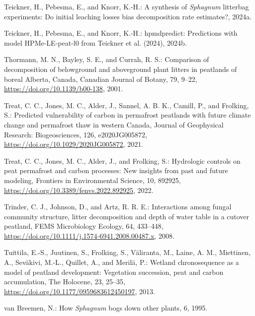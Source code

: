 \documentclass[
  12pt,
]{article}
\newlength{\cslhangindent}
\newlength{\cslentryspacingunit} %
\newenvironment{CSLReferences}[2] %
 {%
  \setlength{\parindent}{0pt}
  \ifodd #1
  \let\oldpar\par
  \def\par{\hangindent=\cslhangindent\oldpar}
  \fi
  \setlength{\parskip}{#2\cslentryspacingunit}
 }%
 {}
\begin{document}
\begin{CSLReferences}{0}{0}
\leavevmode{}%
Teickner, H., Pebesma, E., and Knorr, K.-H.: A synthesis of {\emph{Sphagnum}} litterbag experiments: {Do} initial leaching losses bias decomposition rate estimates?, 2024a.

\leavevmode{}%
Teickner, H., Pebesma, E., and Knorr, K.-H.: {hpmdpredict}: {Predictions} with model {HPMe-LE-peat-l0} from {Teickner} et al. (2024), 2024b.

\leavevmode{}%
Thormann, M. N., Bayley, S. E., and Currah, R. S.: Comparison of decomposition of belowground and aboveground plant litters in peatlands of boreal {Alberta}, {Canada}, Canadian Journal of Botany, 79, 9--22, \url{https://doi.org/10.1139/b00-138}, 2001.

\leavevmode{}%
Treat, C. C., Jones, M. C., Alder, J., Sannel, A. B. K., Camill, P., and Frolking, S.: Predicted vulnerability of carbon in permafrost peatlands with future climate change and permafrost thaw in western {Canada}, Journal of Geophysical Research: Biogeosciences, 126, e2020JG005872, \url{https://doi.org/10.1029/2020JG005872}, 2021.

\leavevmode{}%
Treat, C. C., Jones, M. C., Alder, J., and Frolking, S.: Hydrologic controls on peat permafrost and carbon processes: {New} insights from past and future modeling, Frontiers in Environmental Science, 10, 892925, \url{https://doi.org/10.3389/fenvs.2022.892925}, 2022.

\leavevmode{}%
Trinder, C. J., Johnson, D., and Artz, R. R. E.: Interactions among fungal community structure, litter decomposition and depth of water table in a cutover peatland, FEMS Microbiology Ecology, 64, 433--448, \url{https://doi.org/10.1111/j.1574-6941.2008.00487.x}, 2008.

\leavevmode{}%
Tuittila, E.-S., Juutinen, S., Frolking, S., Väliranta, M., Laine, A. M., Miettinen, A., Seväkivi, M.-L., Quillet, A., and Merilä, P.: Wetland chronosequence as a model of peatland development: {Vegetation} succession, peat and carbon accumulation, The Holocene, 23, 25--35, \url{https://doi.org/10.1177/0959683612450197}, 2013.

\leavevmode{}%
van Breemen, N.: How {\emph{Sphagnum}} bogs down other plants, 6, 1995.


\end{CSLReferences}
\end{document}
